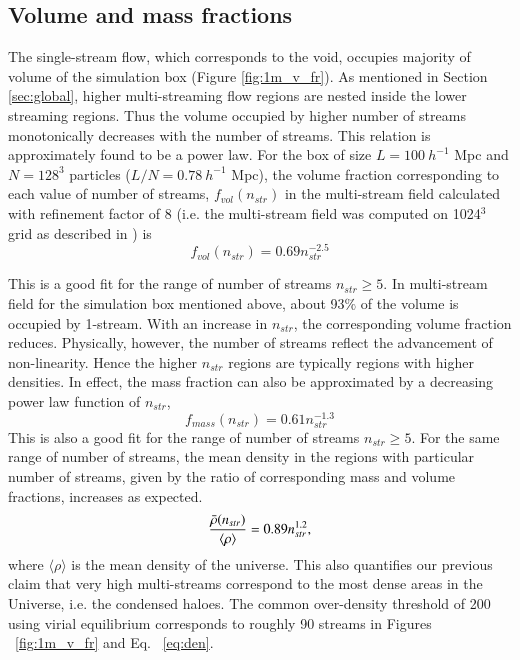 \subsection{Volume and mass fractions}

The single-stream flow, which corresponds to the void, occupies majority of volume of the simulation box (Figure \ref{fig:1m_v_fr}). As mentioned in Section \ref{sec:global}, higher multi-streaming flow regions are nested inside the lower streaming regions. Thus the volume occupied by higher number of streams monotonically decreases with the number of streams. This relation is approximately found to be a power law. For the box of size $L =100 ~h^{-1}$ Mpc and $N = 128^3$ particles ($L/N = 0.78 ~h^{-1}$ Mpc), the volume fraction corresponding to each value of number of streams, $ f_{vol}(n_{str})$ in the multi-stream field calculated with refinement factor of 8 (i.e. the multi-stream field
was computed on 1024$^3$ grid as described in \cite{Shandarin2012}) is 
\begin{equation}
\label{eq:fr_vol}
f_{vol}(n_{str}) =  0.69 n_{str}^{-2.5}
\end{equation}


This is a good fit for the range of number of streams $n_{str} \ge 5 $. In multi-stream field for the simulation box mentioned above, about 93$\%$ of the volume is occupied by 1-stream. With an increase in $n_{str}$, the corresponding volume fraction reduces. Physically, however, the number of streams reflect the advancement of non-linearity. Hence the higher $n_{str}$ regions are typically regions with higher densities. In effect, the mass fraction can also be approximated by a decreasing power law function of $n_{str}$,  
\begin{equation}
\label{eq:fr_mass}
f_{mass}(n_{str}) = 0.61 n_{str}^{-1.3}
\end{equation}
This is also a good fit for the range of number of streams $n_{str} \ge 5 $. For the same range of number of streams, the mean density in the regions with particular number of streams, given by the  ratio of corresponding mass and volume fractions, increases as expected.
\begin{equation}
\label{eq:den}
{\bar{\rho}(n_{str}) \over \langle{\rho}\rangle} = 0.89  n_{str}^{1.2} ,
\end{equation}
where $\langle\rho\rangle$ is the mean density of the universe.
This also quantifies our previous claim that very high multi-streams correspond to the most dense areas in the Universe, i.e. the condensed haloes. The common over-density threshold of 200 using virial equilibrium corresponds to roughly 90 streams in  Figures ~\ref{fig:1m_v_fr} and Eq. ~\ref{eq:den}.

